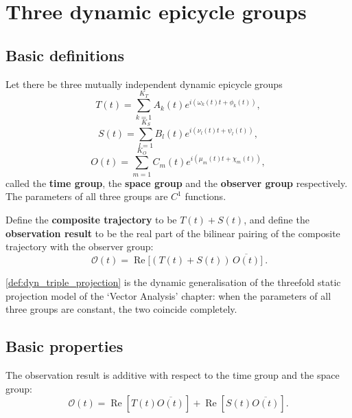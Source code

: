 \section{Three dynamic epicycle groups}
\label{sec:dyn_triple}

\subsection{Basic definitions}

\begin{definition}\label{def:dyn_triple_groups}
Let there be three mutually independent dynamic epicycle groups
\[
T(t)=\sum_{k=1}^{K_T}A_k(t)e^{i(\omega_k(t)t+\phi_k(t))},
\]
\[
S(t)=\sum_{l=1}^{K_S}B_l(t)e^{i(\nu_l(t)t+\psi_l(t))},
\]
\[
O(t)=\sum_{m=1}^{K_O}C_m(t)e^{i(\mu_m(t)t+\chi_m(t))},
\]
called the \textbf{time group}, the \textbf{space group} and the \textbf{observer group} respectively. The parameters of all three groups are $C^1$ functions.
\end{definition}

\begin{definition}\label{def:dyn_triple_projection}
Define the \textbf{composite trajectory} to be $T(t)+S(t)$, and define the \textbf{observation result} to be the real part of the bilinear pairing of the composite trajectory with the observer group:
\[
\boxed{\ \mathcal O(t)=\operatorname{Re}\!\big[(T(t)+S(t))\,\overline{O(t)}\big]\ }.
\]
\end{definition}

\begin{remark}\label{rem:dyn_triple_static_relation}
\cref{def:dyn_triple_projection} is the dynamic generalisation of the threefold static projection model of the `Vector Analysis' chapter: when the parameters of all three groups are constant, the two coincide completely.
\end{remark}

\subsection{Basic properties}

\begin{proposition}\label{prop:dyn_triple_additivity}
The observation result is additive with respect to the time group and the space group:
\[
\mathcal O(t)=\operatorname{Re}[T(t)\overline{O(t)}]+\operatorname{Re}[S(t)\overline{O(t)}].
\]
\end{proposition}

